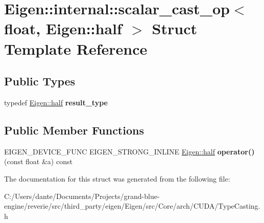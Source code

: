 \hypertarget{struct_eigen_1_1internal_1_1scalar__cast__op_3_01float_00_01_eigen_1_1half_01_4}{}\section{Eigen\+::internal\+::scalar\+\_\+cast\+\_\+op$<$ float, Eigen\+::half $>$ Struct Template Reference}
\label{struct_eigen_1_1internal_1_1scalar__cast__op_3_01float_00_01_eigen_1_1half_01_4}
\subsection*{Public Types}
\begin{DoxyCompactItemize}
\item 
\mbox{\label{struct_eigen_1_1internal_1_1scalar__cast__op_3_01float_00_01_eigen_1_1half_01_4_a66542585946e4e24748a6460f1e315bc}} 
typedef \mbox{\hyperlink{struct_eigen_1_1half}{Eigen\+::half}} {\bfseries result\+\_\+type}
\end{DoxyCompactItemize}
\subsection*{Public Member Functions}
\begin{DoxyCompactItemize}
\item 
\mbox{\label{struct_eigen_1_1internal_1_1scalar__cast__op_3_01float_00_01_eigen_1_1half_01_4_a660d04ab9854a3de5beed9f4ec23e2e0}} 
E\+I\+G\+E\+N\+\_\+\+D\+E\+V\+I\+C\+E\+\_\+\+F\+U\+NC E\+I\+G\+E\+N\+\_\+\+S\+T\+R\+O\+N\+G\+\_\+\+I\+N\+L\+I\+NE \mbox{\hyperlink{struct_eigen_1_1half}{Eigen\+::half}} {\bfseries operator()} (const float \&a) const
\end{DoxyCompactItemize}


The documentation for this struct was generated from the following file\+:\begin{DoxyCompactItemize}
\item 
C\+:/\+Users/dante/\+Documents/\+Projects/grand-\/blue-\/engine/reverie/src/third\+\_\+party/eigen/\+Eigen/src/\+Core/arch/\+C\+U\+D\+A/Type\+Casting.\+h\end{DoxyCompactItemize}

